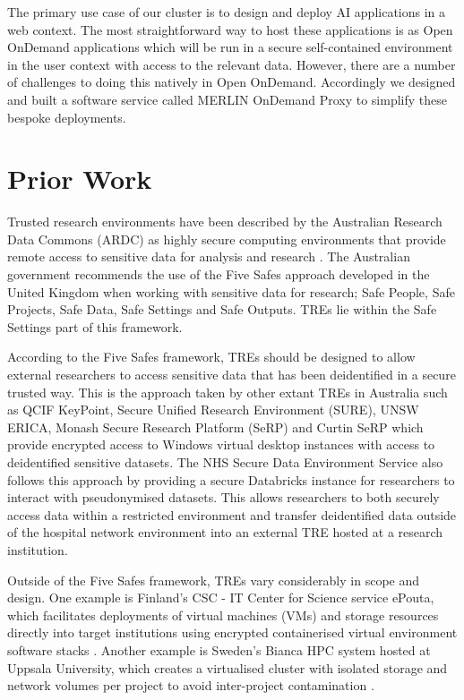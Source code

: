 \documentclass[sigconf,authordraft]{acmart}
\begin{document}
The primary use case of our cluster is to design and deploy AI applications in a web context. The most straightforward way to host these applications is as Open OnDemand applications which will be run in a secure self-contained environment in the user context with access to the relevant data. However, there are a number of challenges to doing this natively in Open OnDemand. Accordingly we designed and built a software service called MERLIN OnDemand Proxy to simplify these bespoke deployments. 

\section{Prior Work}
Trusted research environments have been described by the Australian Research Data Commons (ARDC) as highly secure computing environments that provide remote access to sensitive data for analysis and research \cite{ward_trusted_2024}. The Australian government recommends the use of the Five Safes approach developed in the United Kingdom when working with sensitive data for research; Safe People, Safe Projects, Safe Data, Safe Settings and Safe Outputs. TREs lie within the Safe Settings part of this framework. 

According to the Five Safes framework, TREs should be designed to allow external researchers to access sensitive data that has been deidentified in a secure trusted way. This is the approach taken by other extant TREs in Australia such as QCIF KeyPoint, Secure Unified Research Environment (SURE), UNSW ERICA, Monash Secure Research Platform (SeRP) and Curtin SeRP which provide encrypted access to Windows virtual desktop instances with access to deidentified sensitive datasets. The NHS Secure Data Environment Service also follows this approach by providing a secure Databricks instance for researchers to interact with pseudonymised datasets. This allows researchers to both securely access data within a restricted environment and transfer deidentified data outside of the hospital network environment into an external TRE hosted at a research institution.

Outside of the Five Safes framework, TREs vary considerably in scope and design. One example is Finland's CSC - IT Center for Science service ePouta, which facilitates deployments of virtual machines (VMs) and storage resources directly into target institutions using encrypted containerised virtual environment software stacks \cite{noauthor_sensitive_nodate}. Another example is Sweden's Bianca HPC system hosted at Uppsala University, which creates a virtualised cluster with isolated storage and network volumes per project to avoid inter-project contamination \cite{noauthor_bianca_2024}.
\end{document}
